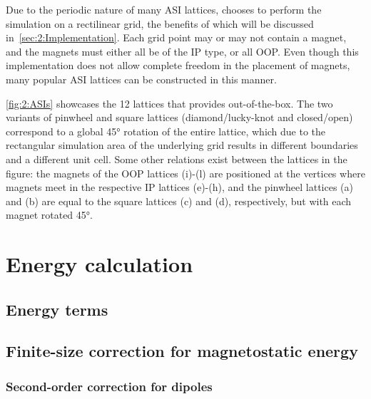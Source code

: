 Due to the periodic nature of many ASI lattices, \hotspice chooses to perform the simulation on a rectilinear grid, the benefits of which will be discussed in~\cref{sec:2:Implementation}.
Each grid point may or may not contain a magnet, and the magnets must either all be of the IP type, or all OOP.
Even though this implementation does not allow complete freedom in the placement of magnets, many popular ASI lattices can be constructed in this manner. \par
\cref{fig:2:ASIs} showcases the 12 lattices that \hotspice provides out-of-the-box. The two variants of pinwheel and square lattices (diamond/lucky-knot and closed/open) correspond to a global \ang{45} rotation of the entire lattice, which due to the rectangular simulation area of the underlying grid results in different boundaries and a different unit cell.
Some other relations exist between the lattices in the figure: the magnets of the OOP lattices (i)-(l) are positioned at the vertices where magnets meet in the respective IP lattices (e)-(h), and the pinwheel lattices (a) and (b) are equal to the square lattices (c) and (d), respectively, but with each magnet rotated \ang{45}. \\\par



\section{Energy calculation}
\subsection{Energy terms}
\subsection{Finite-size correction for magnetostatic energy}
\subsubsection{Second-order correction for dipoles}
